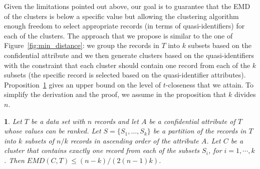 \documentclass[10pt,journal,compsoc]{IEEEtran}
\theoremstyle{definition}
\theoremstyle{plain}
\newtheorem{prop}{\protect\propositionname}
\providecommand{\propositionname}{Proposition}
\begin{document}
Given the limitations pointed out above, our goal is to guarantee
that the EMD of the clusters is below a specific value but allowing
the clustering algorithm enough freedom to select appropriate records
(in terms of quasi-identifiers) for each of the clusters. The approach
that we propose is similar to the one of Figure~\ref{fig:min_distance}:
we group the records in $T$ into $k$ subsets based on the confidential
attribute and we then generate clusters based on
the quasi-identifiers with the constraint that each 
cluster should contain one record
from each of the $k$ subsets (the specific record is selected based on
the quasi-identifier attributes). Proposition~\ref{prop:upper_bound}
gives an upper bound on the level of $t$-closeness that we attain.
To simplify the derivation and 
the proof, we assume in the proposition that $k$ divides $n$.
\begin{prop}
	\label{prop:upper_bound}Let $T$ be a data set with $n$ records
and let $A$ be a confidential 
attribute of $T$ whose values can be ranked. 
Let $S=\{S_{1},\ldots,S_{k}\}$
	be a partition of the records in $T$ into $k$ subsets of $n/k$
	records in ascending order of the attribute $A$. Let $C$ be a
	cluster that contains exactly one record from each of the 
subsets $S_{i}$, for $i=1, \cdots, k$.
	Then $EMD(C,T)\le(n-k)/(2(n-1)k)$.\end{prop}
\end{document}
